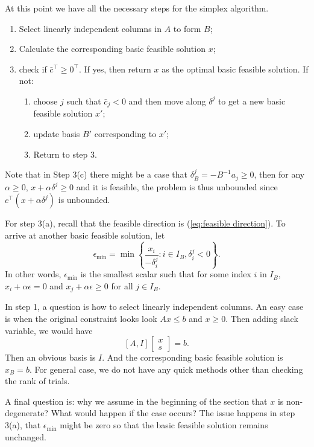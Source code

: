 \documentclass[12pt,a4paper]{report}
\numberwithin{equation}{section}
\theoremstyle{mystyle}
\newcommand{\T}{\top}
\begin{document}
	At this point we have all the necessary steps for the simplex algorithm.
	\begin{enumerate}
		\item Select linearly independent columns in $A$ to form $B$;
		\item Calculate the corresponding basic feasible solution $x$;
		\item check if $\bar{c}^\T\geq 0^\T$. If yes, then return $x$ as the optimal basic feasible solution. If not:
		\begin{enumerate}
			\item choose $j$ such that $\bar{c}_j<0$ and then move along $\delta^j$ to get a new basic feasible solution $x'$;
			\item update basis $B'$ corresponding to $x'$;
			\item Return to step 3.
		\end{enumerate}
	\end{enumerate}
	Note that in Step 3(c) there might be a case that $\delta^j_B=-B^{-1}a_j\geq 0$, then for any $\alpha\geq0$, $x+\alpha \delta^j\geq0$ and it is feasible, the problem is thus unbounded since $c^\T (x+\alpha \delta^j)$ is unbounded.
	
	For step 3(a), recall that the feasible direction is (\ref{eq:feasible direction}). To arrive at another basic feasible solution, let
	$$
	\epsilon_{\min} = \min \left\{\frac{x_i}{-\delta_i^j}:i\in I_B,\delta^j_i<0\right\}.
	$$
	In other words, $\epsilon_{\min}$ is the smallest scalar such that for some index $i$ in $I_B$, $x_i+\alpha \epsilon=0$ and $x_j+\alpha \epsilon\geq 0$ for all $j\in I_B$.
	
	In step 1, a question is how to select linearly independent columns. An easy case is when the original constraint looks look $Ax\leq b$ and $x\geq 0$. Then adding slack variable, we would have
	$$
	[A,I]
	\begin{bmatrix}
		x\\
		s
	\end{bmatrix}=b.
	$$
	Then an obvious basis is $I$. And the corresponding basic feasible solution is $x_B=b$. For general case, we do not have any quick methods other than checking the rank of trials.
	
	A final question is: why we assume in the beginning of the section that $x$ is non-degenerate? What would happen if the case occurs? The issue happens in step 3(a), that $\epsilon_{\min}$ might be zero so that the basic feasible solution remains unchanged.
	
	
	
\end{document}
